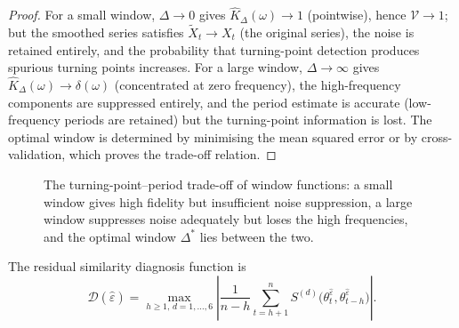 \begin{proof}
For a small window, $\Delta \to 0$ gives $\hat{K}_\Delta(\omega) \to 1$ (pointwise), hence $\mathcal{V} \to 1$; but the smoothed series satisfies $\tilde{X}_t \to X_t$ (the original series), the noise is retained entirely, and the probability that turning-point detection produces spurious turning points increases. For a large window, $\Delta \to \infty$ gives $\hat{K}_\Delta(\omega) \to \delta(\omega)$ (concentrated at zero frequency), the high-frequency components are suppressed entirely, and the period estimate is accurate (low-frequency periods are retained) but the turning-point information is lost. The optimal window is determined by minimising the mean squared error or by cross-validation, which proves the trade-off relation.
\end{proof}

\begin{figure}[htbp]
\centering
{}
\caption{The turning-point--period trade-off of window functions: a small window gives high fidelity but insufficient noise suppression, a large window suppresses noise adequately but loses the high frequencies, and the optimal window $\Delta^*$ lies between the two.}
\label{fig:window_tradeoff}
\end{figure}

\begin{proposition}\label{prop:ts_residual_diagnosis}
The residual similarity diagnosis function is
\[
\mathcal{D}(\hat{\varepsilon}) =
\max_{h \ge 1,\, d = 1,\dots,6}
\left|
\frac{1}{n-h} \sum_{t=h+1}^{n}
S^{(d)}\big(\theta_t^{\hat{\varepsilon}}, \theta_{t-h}^{\hat{\varepsilon}}\big)
\right|.
\]
\end{proposition}

